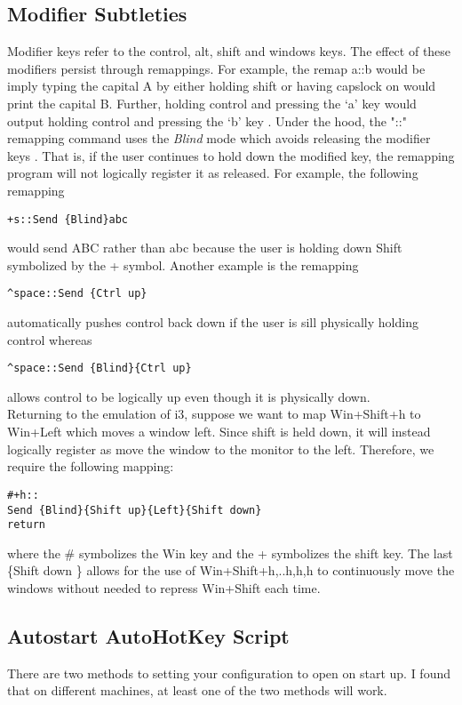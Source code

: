 \subsection{Modifier Subtleties}
Modifier keys refer to the control, alt, shift and windows keys.  The effect of
these modifiers persist through remappings. For example, the remap a::b would be
imply typing the capital A by either holding shift or having capslock on would
print the capital B. Further, holding control and pressing the `a' key would
output holding control and pressing the `b' key \cite{autohotkeys2005remap}.
Under the hood, the "::" remapping command uses the \emph{Blind} mode which
avoids releasing the modifier keys \cite{autohotkeys2005send}. That is, if the
user continues to hold down the modified key, the remapping program will not
logically register it as released. For example, the following remapping
\begin{lstlisting}
+s::Send {Blind}abc
\end{lstlisting}
would send ABC rather than abc because the user is holding down Shift symbolized
by the + symbol. Another example is the remapping
\begin{lstlisting}
^space::Send {Ctrl up}
\end{lstlisting}
automatically pushes control back down if the user is sill physically holding
control whereas
\begin{lstlisting}
^space::Send {Blind}{Ctrl up}
\end{lstlisting}
allows control to be logically up even though it is physically down.\\

Returning to the emulation of i3, suppose we want to map Win+Shift+h to Win+Left
which moves a window left. Since shift is held down, it will instead logically
register as move the window to the monitor to the left. Therefore, we require
the following mapping:
\begin{lstlisting}
#+h::
Send {Blind}{Shift up}{Left}{Shift down}
return
\end{lstlisting}
where the \# symbolizes the Win key and the + symbolizes the shift key. The last
\{Shift down \} allows for the use of Win+Shift+h,..h,h,h to continuously move
the windows without needed to repress Win+Shift each time.

\subsection{Autostart AutoHotKey Script} \label{SecAutostart}
There are two methods to setting your configuration to open on start up. I found
that on different machines, at least one of the two methods will work.\\

